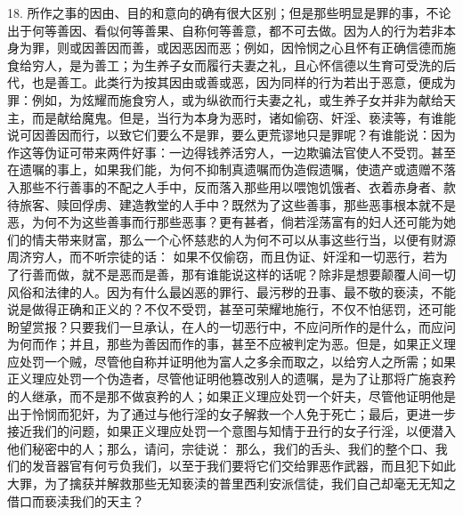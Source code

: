 18. 所作之事的因由、目的和意向的确有很大区别；但是那些明显是罪的事，不论出于何等善因、看似何等善果、自称何等善意，都不可去做。因为人的行为若非本身为罪，则或因善因而善，或因恶因而恶；例如，因怜悯之心且怀有正确信德而施食给穷人，是为善工；为生养子女而履行夫妻之礼，且心怀信德以生育可受洗的后代，也是善工。此类行为按其因由或善或恶，因为同样的行为若出于恶意，便成为罪：例如，为炫耀而施食穷人，或为纵欲而行夫妻之礼，或生养子女并非为献给天主，而是献给魔鬼。但是，当行为本身为恶时，诸如偷窃、奸淫、亵渎等，有谁能说可因善因而行，以致它们要么不是罪，要么更荒谬地只是罪呢？有谁能说：因为作这等伪证可带来两件好事：一边得钱养活穷人，一边欺骗法官使人不受罚。甚至在遗嘱的事上，如果我们能，为何不抑制真遗嘱而伪造假遗嘱，使遗产或遗赠不落入那些不行善事的不配之人手中，反而落入那些用以喂饱饥饿者、衣着赤身者、款待旅客、赎回俘虏、建造教堂的人手中？既然为了这些善事，那些恶事根本就不是恶，为何不为这些善事而行那些恶事？更有甚者，倘若淫荡富有的妇人还可能为她们的情夫带来财富，那么一个心怀慈悲的人为何不可以从事这些行当，以便有财源周济穷人，而不听宗徒的话：  如果不仅偷窃，而且伪证、奸淫和一切恶行，若为了行善而做，就不是恶而是善，那有谁能说这样的话呢？除非是想要颠覆人间一切风俗和法律的人。因为有什么最凶恶的罪行、最污秽的丑事、最不敬的亵渎，不能说是做得正确和正义的？不仅不受罚，甚至可荣耀地施行，不仅不怕惩罚，还可能盼望赏报？只要我们一旦承认，在人的一切恶行中，不应问所作的是什么，而应问为何而作；并且，那些为善因而作的事，甚至不应被判定为恶。但是，如果正义理应处罚一个贼，尽管他自称并证明他为富人之多余而取之，以给穷人之所需；如果正义理应处罚一个伪造者，尽管他证明他篡改别人的遗嘱，是为了让那将广施哀矜的人继承，而不是那不做哀矜的人；如果正义理应处罚一个奸夫，尽管他证明他是出于怜悯而犯奸，为了通过与他行淫的女子解救一个人免于死亡；最后，更进一步接近我们的问题，如果正义理应处罚一个意图与知情于丑行的女子行淫，以便潜入他们秘密中的人；那么，请问，宗徒说：  那么，我们的舌头、我们的整个口、我们的发音器官有何亏负我们，以至于我们要将它们交给罪恶作武器，而且犯下如此大罪，为了擒获并解救那些无知亵渎的普里西利安派信徒，我们自己却毫无无知之借口而亵渎我们的天主？\par

